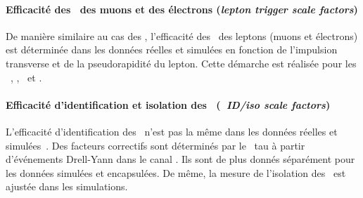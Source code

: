 \paragraph{Efficacité des \HLTpaths\ des muons et des électrons (\emph{lepton trigger scale factors})}
De manière similaire au cas des \tauh, l'efficacité des \HLTpaths\ des leptons (muons et électrons) est déterminée dans les données réelles et simulées en fonction de l'impulsion transverse et de la pseudorapidité du lepton.
Cette démarche est réalisée pour les \HLTpaths\ \HLTSingleMu, \HLTSingleEle, \HLTMuTauCross\ et \HLTEleTauCross.
\paragraph{Efficacité d'identification et isolation des \tauh\ (\emph{\tauh\ ID/iso scale factors})}
L'efficacité d'identification des \tauh\ n'est pas la même dans les données réelles et simulées~\cite{TauPOG}.
Des facteurs correctifs sont déterminés par le \POG\ tau à partir d'événements Drell-Yann dans le canal \mu\tauh.
Ils sont de plus donnés séparément pour les données simulées et encapsulées.
De même, la mesure de l'isolation des \tauh\ est ajustée dans les simulations.
